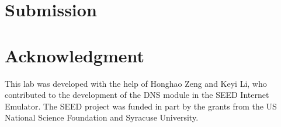 \section{Submission}





\section*{Acknowledgment} 

This lab was developed with the help of Honghao Zeng and Keyi Li, who
contributed to the development of the DNS module in the SEED 
Internet Emulator. The SEED project was funded in part 
by the grants from the US National Science Foundation
and Syracuse University.




